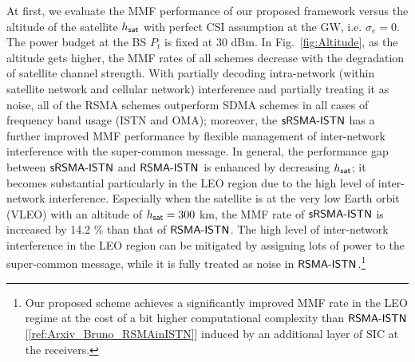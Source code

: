 \documentclass[draftclsnofoot, onecolumn, comsoc, 12pt]{IEEEtran}
\begin{document}
At first, we evaluate the MMF performance of our proposed framework versus the altitude of the satellite $h_{\sf sat}$ with perfect CSI assumption at the GW, i.e. $\sigma_e=0$.
The power budget at the BS $P_{t}$ is fixed at 30 dBm.
In Fig.~\ref{fig:Altitude}, as the altitude gets higher, the MMF rates of all schemes decrease with the degradation of satellite channel strength.
{With partially decoding intra-network (within satellite network and cellular network) interference and partially treating it as noise, all of the RSMA schemes outperform SDMA schemes in all cases of frequency band usage (ISTN and OMA); moreover, the $\sf{sRSMA\mbox{-}ISTN}$ has a further improved MMF performance by flexible management of inter-network interference with the super-common message. 
In general, the performance gap between $\sf{sRSMA\mbox{-}ISTN}$ and $\sf{RSMA\mbox{-}ISTN}$ is enhanced by decreasing $h_{\sf{sat}}$; it becomes substantial particularly in the LEO region due to the high level of inter-network interference. 
Especially when the satellite is at the very low Earth orbit (VLEO) with an altitude of $h_{\sf sat}=300$ km, the MMF rate of $\sf{sRSMA\mbox{-}ISTN}$ is increased by 14.2 \% than that of $\sf{RSMA\mbox{-}ISTN}$. 
The high level of inter-network interference in the LEO region can be mitigated by assigning lots of power to the super-common message, while it is fully treated as noise in $\sf{RSMA\mbox{-}ISTN}$.\footnote{{%
Our proposed scheme achieves a significantly improved MMF rate in the LEO regime at the cost of a bit higher computational complexity than $\sf{RSMA\mbox{-}ISTN}$  \mbox{[\ref{ref:Arxiv_Bruno_RSMAinISTN}]} induced by an additional layer of SIC at the receivers.
}}}
\end{document}
